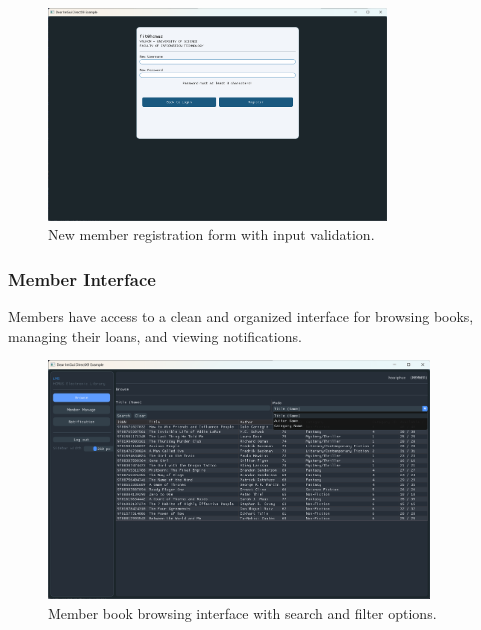 \begin{figure}[H]
	\centering
	\includegraphics[width=0.8\textwidth]{figures/screenshot_register.png}
	\caption{New member registration form with input validation.}
	\label{fig:ss_register}
\end{figure}

\subsubsection{Member Interface}
Members have access to a clean and organized interface for browsing books, managing their loans, and viewing notifications.

\begin{figure}[H]
	\centering
	\includegraphics[width=0.9\textwidth]{figures/screenshot_member_browse.png}
	\caption{Member book browsing interface with search and filter options.}
	\label{fig:ss_member_browse}
\end{figure}

